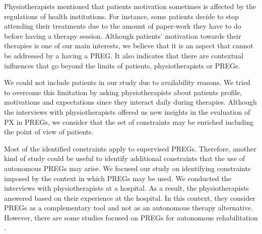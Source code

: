 Physiotherapists mentioned that patients motivation sometimes is affected by the regulations of health institutions. For instance, some patients decide to stop attending their treatments due to the amount of paper-work they have to do before having a therapy session. Although patients' motivation towards their therapies is one of our main interests, we believe that it is an aspect that cannot be addressed by a having a \ac{PREG}. It also indicates that there are contextual influences that go beyond the limits of patients, physiotherapists or \acp{PREG}.
 
We could not include patients in our study due to availability reasons. We tried to overcome this limitation by asking physiotherapists about patients profile, motivations and expectations since they interact daily during therapies. Although the interviews with physiotherapists offered us new insights in the evaluation of \ac{PX} in \acp{PREG}, we consider that the set of constraints may be enriched including the point of view of patients.

Most of the identified constraints apply to supervised \acp{PREG}. Therefore, another kind of study could be useful to identify additional constraints that the use of autonomous \acp{PREG} may arise. We focused our study on identifying constraints imposed by the context in which \acp{PREG} may be used. We conducted the interviews with physiotherapists at a hospital. As a result, the physiotherapists answered based on their experience at the hospital. In this context, they consider \acp{PREG} as a complementary tool and not as an autonomous therapy alternative. However, there are some studies focused on \acp{PREG} for autonomous rehabilitation \autocite{PirovanoAdvisor2012}.



